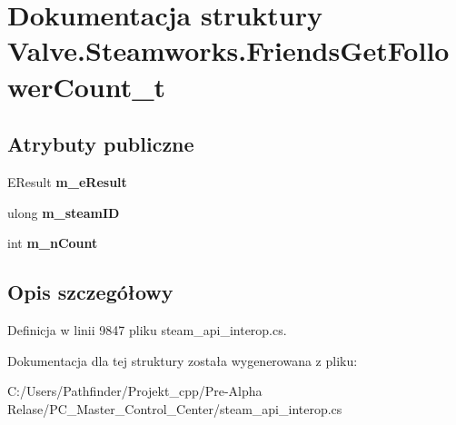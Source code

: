 \hypertarget{struct_valve_1_1_steamworks_1_1_friends_get_follower_count__t}{}\section{Dokumentacja struktury Valve.\+Steamworks.\+Friends\+Get\+Follower\+Count\+\_\+t}
\label{struct_valve_1_1_steamworks_1_1_friends_get_follower_count__t}
\subsection*{Atrybuty publiczne}
\begin{DoxyCompactItemize}
\item 
\mbox{\label{struct_valve_1_1_steamworks_1_1_friends_get_follower_count__t_a163e4d54d50d507152ad275f4f055cb9}} 
E\+Result {\bfseries m\+\_\+e\+Result}
\item 
\mbox{\label{struct_valve_1_1_steamworks_1_1_friends_get_follower_count__t_a02cc7aa25e5eddbd5ef1b7b0593dd6b0}} 
ulong {\bfseries m\+\_\+steam\+ID}
\item 
\mbox{\label{struct_valve_1_1_steamworks_1_1_friends_get_follower_count__t_ae6aab51df4190d81638862d03ad35e62}} 
int {\bfseries m\+\_\+n\+Count}
\end{DoxyCompactItemize}


\subsection{Opis szczegółowy}


Definicja w linii 9847 pliku steam\+\_\+api\+\_\+interop.\+cs.



Dokumentacja dla tej struktury została wygenerowana z pliku\+:\begin{DoxyCompactItemize}
\item 
C\+:/\+Users/\+Pathfinder/\+Projekt\+\_\+cpp/\+Pre-\/\+Alpha Relase/\+P\+C\+\_\+\+Master\+\_\+\+Control\+\_\+\+Center/steam\+\_\+api\+\_\+interop.\+cs\end{DoxyCompactItemize}
